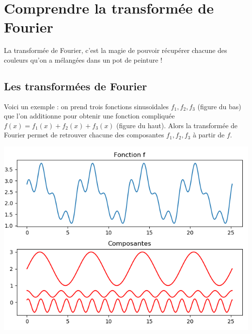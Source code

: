 \documentclass[11pt,class=report,crop=false]{standalone}
\begin{document}






\section{Comprendre la transformée de Fourier}

La transformée de Fourier, c'est la magie de pouvoir récupérer chacune des couleurs qu'on a mélangées dans un pot de peinture !

\subsection{Les transformées de Fourier}

Voici un exemple : on prend trois fonctions sinusoïdales $f_1, f_2, f_3$ (figure du bas) que l'on additionne pour obtenir une fonction compliquée $f(x) = f_1(x) + f_2(x) + f_3(x)$ (figure du haut). Alors la transformée de Fourier permet de retrouver chacune des composantes $f_1, f_2, f_3$ à partir de $f$.

\begin{center}
\includegraphics[scale=\myscale,scale=0.7]{figures/fourier-1}
\end{center}
\end{document}
